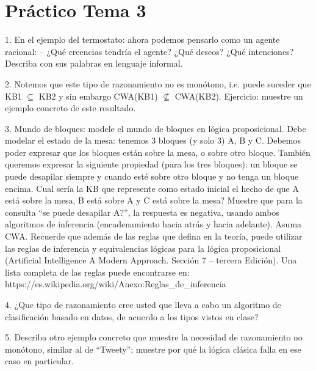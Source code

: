 \chapter{Práctico Tema 3}

1. En el ejemplo del termostato: ahora podemos pensarlo como un agente racional: – ¿Qué creencias tendría el agente? ¿Qué deseos? ¿Qué intenciones? Describa con sus palabras en lenguaje informal. 

2. Notemos que este tipo de razonamiento no es monótono, i.e. puede suceder que KB1 $\subseteq$ KB2 y sin embargo CWA(KB1) $\nsubseteq$ CWA(KB2). Ejercicio: muestre un ejemplo concreto de este resultado. 

3. Mundo de bloques: modele el mundo de bloques en lógica proposicional. Debe modelar el estado de la mesa: tenemos 3 bloques (y solo 3) A, B y C. Debemos poder expresar que los bloques están sobre la mesa, o sobre otro bloque. También queremos expresar la siguiente propiedad (para los tres bloques): un bloque se puede desapilar siempre y cuando esté sobre otro bloque y no tenga un bloque encima. Cual sería la KB que represente como estado inicial el hecho de que A está sobre la mesa, B está sobre A y C está sobre la mesa? Muestre que para la consulta “se puede desapilar A?”, la respuesta es negativa, usando ambos algoritmos de inferencia (encadenamiento hacia atrás y hacia adelante). Asuma CWA. Recuerde que además de las reglas que defina en la teoría, puede utilizar las reglas de inferencia y equivalencias lógicas para la lógica proposicional (Artificial Intelligence A Modern Approach. Sección 7 – tercera Edición). Una lista completa de las reglas puede encontrarse en: https://es.wikipedia.org/wiki/Anexo:Reglas_de_inferencia

4. ¿Que tipo de razonamiento cree usted que lleva a cabo un algoritmo de clasificación basado en datos, de acuerdo a los tipos vistos en clase? 

5. Describa otro ejemplo concreto que muestre la necesidad de razonamiento no monótono, similar al de “Tweety”; muestre por qué la lógica clásica falla en ese caso en particular.

\bigskip